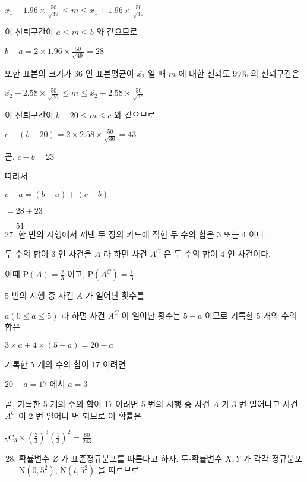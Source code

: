 \documentclass[10pt]{article}
\begin{document}
\(\overline{x_{1}}-1.96 \times \frac{50}{\sqrt{49}} \leq m \leq \overline{x_{1}}+1.96 \times \frac{50}{\sqrt{49}}\)

이 신뢰구간이 \(a \leq m \leq b\) 와 같으므로

\(b-a=2 \times 1.96 \times \frac{50}{\sqrt{49}}=28\)

또한 표본의 크기가 36 인 표본평균이 \(\overline{x_{2}}\) 일 때 \(m\) 에 대한 신뢰도 \(99 \%\) 의 신뢰구간은

\(\overline{x_{2}}-2.58 \times \frac{50}{\sqrt{36}} \leq m \leq \overline{x_{2}}+2.58 \times \frac{50}{\sqrt{36}}\)

이 신뢰구간이 \(b-20 \leq m \leq c\) 와 같으므로

\(c-(b-20)=2 \times 2.58 \times \frac{50}{\sqrt{36}}=43\)

곧, \(c-b=23\)

따라서

\(c-a=(b-a)+(c-b)\)

\(=28+23\)

\(=51\)\\
27. 한 번의 시행에서 꺼낸 두 장의 카드에 적힌 두 수의 합은 3 또는 4 이다.

두 수의 합이 3 인 사건을 \(A\) 라 하면 사건 \(A^{C}\) 은 두 수의 합이 4 인 사건이다.

이때 \(\mathrm{P}(A)=\frac{2}{3}\) 이고, \(\mathrm{P}\left(A^{C}\right)=\frac{1}{3}\)

5 번의 시행 중 사건 \(A\) 가 일어난 횟수를

\(a(0 \leq a \leq 5)\) 라 하면 사건 \(A^{C}\) 이 일어난 횟수는 \(5-a\) 이므로 기록한 5 개의 수의 합은

\(3 \times a+4 \times(5-a)=20-a\)

기록한 5 개의 수의 합이 17 이려면

\(20-a=17\) 에서 \(a=3\)

곧, 기록한 5 개의 수의 합이 17 이려면 5 번의 시행 중 사건 \(A\) 가 3 번 일어나고 사건 \(A^{C}\) 이 2 번 일어나 면 되므로 이 확률은

\({ }_{5} \mathrm{C}_{3} \times\left(\frac{2}{3}\right)^{3}\left(\frac{1}{3}\right)^{2}=\frac{80}{243}\)

\begin{enumerate}
  \setcounter{enumi}{27}
  \item 확률변수 \(Z\) 가 표준정규분포를 따른다고 하자. 두-확률변수 \(X, Y\) 가 각각 정규분포 \(\mathrm{N}\left(0,5^{2}\right)\), \(\mathrm{N}\left(t, 5^{2}\right)\) 을 따르므로
\end{enumerate}
\end{document}
